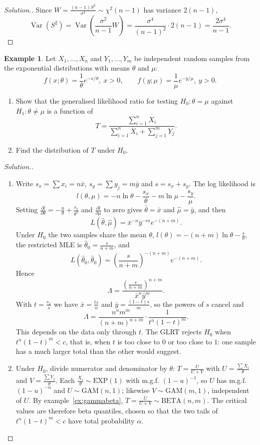 \documentclass[12pt,a4paper]{report}
\theoremstyle{definition}
\newtheorem{example}[thm]{Example}
\theoremstyle{plain}
\newenvironment{solution}
  {\renewcommand{\qedsymbol}{}\begin{proof}[\textit{Solution}.]}
  {\end{proof}}
\begin{document}
\begin{solution}
Since $W = \frac{(n-1)S^2}{\sigma^2}\sim\chi^2(n-1)$ has variance $2(n-1)$,
\[\operatorname{Var}(S^2) = \operatorname{Var}\left(\frac{\sigma^2}{n-1}W\right)
= \frac{\sigma^4}{(n-1)^2}\cdot 2(n-1) = \frac{2\sigma^4}{n-1} .\]
\end{solution}

\begin{example}
\label{ex:glrttwoexp}
Let $X_1,\dots,X_n$ and $Y_1,\dots,Y_m$ be independent random samples from the
exponential distributions with means $\theta$ and $\mu$:
\[f(x;\theta) = \frac1\theta e^{-x/\theta},\ x>0,\qquad
f(y;\mu) = \frac1\mu e^{-y/\mu},\ y>0 .\]
\begin{enumerate}
\item[(a)] Show that the generalised likelihood ratio for testing
$H_0\colon\theta = \mu$ against $H_1\colon\theta\ne\mu$ is a function of
\[T = \frac{\sum_{i=1}^n X_i}{\sum_{i=1}^n X_i + \sum_{j=1}^m Y_j} .\]
\item[(b)] Find the distribution of $T$ under $H_0$.
\end{enumerate}
\end{example}

\begin{solution}
\begin{enumerate}
\item[(a)] Write $s_x = \sum x_i = n\bar x$, $s_y = \sum y_j = m\bar y$ and
$s = s_x + s_y$. The log likelihood is
\[l(\theta,\mu) = -n\ln\theta - \frac{s_x}{\theta} - m\ln\mu - \frac{s_y}{\mu} .\]
Setting $\frac{\partial l}{\partial\theta} = -\frac n\theta + \frac{s_x}{\theta^2}$
and $\frac{\partial l}{\partial\mu}$ to zero gives $\hat\theta = \bar x$ and
$\hat\mu = \bar y$, and then
\[L(\hat\theta,\hat\mu) = \bar x^{-n}\bar y^{-m}e^{-(n+m)} .\]
Under $H_0$ the two samples share the mean $\theta$, $l(\theta) =
-(n+m)\ln\theta - \frac{s}{\theta}$, the restricted MLE is
$\hat\theta_0 = \frac{s}{n+m}$, and
\[L(\hat\theta_0,\hat\theta_0) = \left(\frac{s}{n+m}\right)^{-(n+m)}e^{-(n+m)} .\]
Hence
\[\Lambda = \frac{\left(\frac{s}{n+m}\right)^{n+m}}{\bar x^n\bar y^m} .\]
With $t = \frac{s_x}{s}$ we have $\bar x = \frac{ts}{n}$ and
$\bar y = \frac{(1-t)s}{m}$, so the powers of $s$ cancel and
\[\Lambda = \frac{n^n m^m}{(n+m)^{n+m}}\cdot\frac{1}{t^n(1-t)^m} .\]
This depends on the data only through $t$. The GLRT rejects $H_0$ when
$t^n(1-t)^m<c$, that is, when $t$ is too close to $0$ or too close to $1$: one
sample has a much larger total than the other would suggest.
\item[(b)] Under $H_0$, divide numerator and denominator by $\theta$:
$T = \frac{U}{U+V}$ with $U = \frac{\sum X_i}{\theta}$ and
$V = \frac{\sum Y_j}{\theta}$. Each $\frac{X_i}{\theta}\sim\text{EXP}(1)$ with
m.g.f. $(1-u)^{-1}$, so $U$ has m.g.f. $(1-u)^{-n}$ and $U\sim\text{GAM}(n,1)$;
likewise $V\sim\text{GAM}(m,1)$, independent of $U$. By
example~\ref{ex:gammabeta}, $T = \frac{U}{U+V}\sim\text{BETA}(n,m)$. The critical
values are therefore beta quantiles, chosen so that the two tails of
$t^n(1-t)^m<c$ have total probability $\alpha$.
\end{enumerate}
\end{solution}
\end{document}
